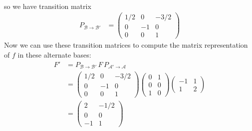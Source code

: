 {\begin{align*}
\end{align*}
so we have transition matrix
\begin{align*}
P_{\mathcal{B}\to\mathcal{B}'}
&=
\begin{pmatrix} 
  1/2 & 0 & -3/2 \\
  0 & -1 & 0 \\
  0 & 0 & 1
\end{pmatrix}
\end{align*}
Now we can use these transition matrices to compute the matrix representation of $f$ in these alternate bases:
\begin{align*}
F' &= P_{\mathcal{B}\to\mathcal{B}'} \, F \, P_{\mathcal{A}'\to\mathcal{A}} \\
&= \begin{pmatrix} 
  1/2 & 0 & -3/2 \\
  0 & -1 & 0 \\
  0 & 0 & 1
\end{pmatrix}
\begin{pmatrix} 
  0 & 1 \\
  0 & 0 \\
  1 & 0
\end{pmatrix}
\begin{pmatrix} 
 -1 & 1 \\ 
  1 & 2
\end{pmatrix} \\
&=
\begin{pmatrix} 
  2 & -1/2 \\
  0 & 0 \\
 -1 & 1
\end{pmatrix}
\end{align*}
}